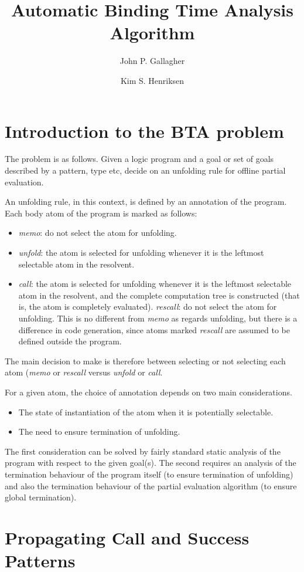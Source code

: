 \documentclass[11pt]{article}
\title{Automatic Binding Time Analysis Algorithm}
\author{John P. Gallagher \and Kim S. Henriksen}
\begin{document}
\maketitle
\section{Introduction to the BTA problem}
The problem is as follows.  Given a logic program and a goal or set of goals
described by a pattern, type etc, decide on an unfolding rule for offline
partial evaluation.

An unfolding rule, in this context, is defined by an annotation of the program.
Each body atom of the program is marked as follows:
\begin{itemize}
\item
{\em memo}:  do not select the atom for unfolding.
\item
{\em unfold}:  the atom is selected for unfolding whenever it is the leftmost
selectable atom in the resolvent.
\item
{\em call}:  the atom is selected for unfolding whenever it is the leftmost
selectable atom in the resolvent,
and the complete computation tree is constructed (that is, the atom is completely
evaluated).
{\em rescall}:  do not select the atom for unfolding.   This is no
different from {\em memo} as regards unfolding, but there is a difference in
code generation, since atoms marked {\em rescall} are assumed to be defined
outside the program.
\end{itemize}
The main decision to make is therefore between selecting or not selecting
each atom ({\em memo} or {\em rescall} versus {\em unfold} or {\em call}.

For a given atom, the choice of annotation depends on two main considerations.
\begin{itemize}
\item
The state of instantiation of the atom when it is potentially selectable.
\item
The need to ensure termination of unfolding.
\end{itemize}
The first consideration can be solved by fairly standard static analysis of the program with 
respect to the given goal(s).  The second requires an analysis of the termination
behaviour of the program itself (to ensure termination of unfolding) and also the
termination behaviour of the partial evaluation algorithm (to ensure global
termination).

\section{Propagating Call and Success Patterns}
\end{document}
